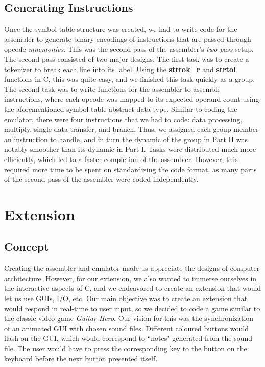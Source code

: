 \documentclass[11pt]{article}
\begin{document}
\subsection{Generating Instructions}

Once the symbol table structure was created, we had to write code for the assembler to generate binary encodings of instructions that are passed through opcode \emph{mnemonics}. This was the second pass of the assembler's \emph{two-pass} setup. The second pass consisted of two major designs. The first task was to create a tokenizer to break each line into its label. Using the \textbf{strtok\_r} and \textbf{strtol} functions in C, this was quite easy, and we finished this task quickly as a group. The second task was to write functions for the assembler to assemble instructions, where each opcode was mapped to its expected operand count using the aforementioned symbol table abstract data type. Similar to coding the emulator, there were four instructions that we had to code: data processing, multiply, single data transfer, and branch. Thus, we assigned each group member an instruction to handle, and in turn the dynamic of the group in Part II was notably smoother than its dynamic in Part I. Tasks were distributed much more efficiently, which led to a faster completion of the assembler. However, this required more time to be spent on standardizing the code format, as many parts of the second pass of the assembler were coded independently.

\section{Extension}

\subsection{Concept}

Creating the assembler and emulator made us appreciate the designs of computer architecture. However, for our extension, we also wanted to immerse ourselves in the interactive aspects of C, and we endeavored to create an extension that would let us use GUIs, I/O, etc. Our main objective was to create an extension that would respond in real-time to user input, so we decided to code a game similar to the classic video game \emph{Guitar Hero}. Our vision for this was the synchronization of an animated GUI with chosen sound files. Different coloured buttons would flash on the GUI, which would correspond to ``notes" generated from the sound file. The user would have to press the corresponding key to the button on the keyboard before the next button presented itself.
\end{document}
